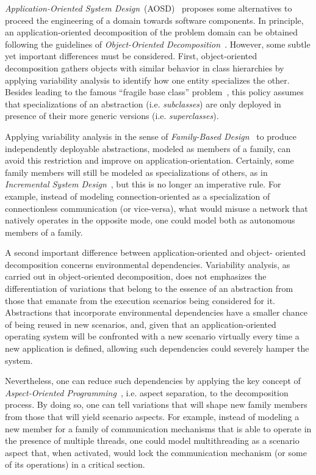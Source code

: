 \documentclass{kapproc} %
\begin{document}
 \emph{Application-Oriented System
 Design}~(AOSD)~\cite{Froehlich:2001} proposes some alternatives to
 proceed the engineering of a domain towards software components. In
 principle, an application-oriented decomposition of the problem
 domain can be obtained following the guidelines of
 \emph{Object-Oriented Decomposition}~\cite{Booch:1994}. However, some
 subtle yet important differences must be considered. First,
 object-oriented decomposition gathers objects with similar behavior
 in class hierarchies by applying variability analysis to identify how
 one entity specializes the other.  Besides leading to the famous
 ``fragile base class'' problem~\cite{Mikhajlov:1998}, this policy
 assumes that specializations of an abstraction
 (i.e. \emph{subclasses}) are only deployed in presence of their more
 generic versions (i.e. \emph{superclasses}).

 Applying variability analysis in the sense of \emph{Family-Based
 Design}~\cite{Parnas:1976} to produce independently deployable
 abstractions, modeled as members of a family, can avoid this
 restriction and improve on application-orientation.  Certainly, some
 family members will still be modeled as specializations of others, as
 in \emph{Incremental System Design}~\cite{Habermann:1976}, but this
 is no longer an imperative rule. For example, instead of modeling
 connection-oriented as a specialization of connectionless
 communication (or vice-versa), what would misuse a network that
 natively operates in the opposite mode, one could model both as
 autonomous members of a family.

 A second important difference between application-oriented and
 object- oriented decomposition concerns environmental dependencies.
 Variability analysis, as carried out in object-oriented
 decomposition, does not emphasizes the differentiation of variations
 that belong to the essence of an abstraction from those that emanate
 from the execution scenarios being considered for it. Abstractions
 that incorporate environmental dependencies have a smaller chance of
 being reused in new scenarios, and, given that an
 application-oriented operating system will be confronted with a new
 scenario virtually every time a new application is defined, allowing
 such dependencies could severely hamper the system.

 Nevertheless, one can reduce such dependencies by applying the key
 concept of \emph{Aspect-Oriented Programming}~\cite{Kiczales:1997},
 i.e.  aspect separation, to the decomposition process.  By doing so,
 one can tell variations that will shape new family members from those
 that will yield scenario aspects. For example, instead of modeling a
 new member for a family of communication mechanisms that is able to
 operate in the presence of multiple threads, one could model
 multithreading as a scenario aspect that, when activated, would lock
 the communication mechanism (or some of its operations) in a critical
 section.
\end{document}
